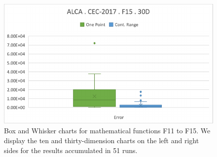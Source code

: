\documentclass[graybox]{svmult}
\begin{document}
\begin{figure}[!ht]
\begin{minipage}[h]{0.49\linewidth}
        \end{minipage}
        \hfill
        \vspace{0.05 cm}
        \begin{minipage}[h]{0.49\linewidth}
            \includegraphics[width=1\linewidth]{img/fig_experiment_F15x30D.pdf} 
        \end{minipage}

        \caption{Box and Whisker charts for mathematical functions F11 to F15. We display the ten and thirty-dimension charts on the left and right sides for the results accumulated in 51 runs.} \label{fig.experiment_F11-F15}
    \end{figure}

    \FloatBarrier
\end{document}
